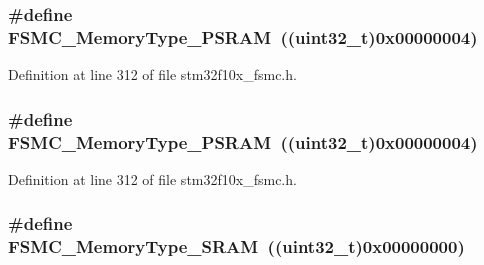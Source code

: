 \subsubsection[{\texorpdfstring{F\+S\+M\+C\+\_\+\+Memory\+Type\+\_\+\+P\+S\+R\+AM}{FSMC_MemoryType_PSRAM}}]{\setlength{\rightskip}{0pt plus 5cm}\#define F\+S\+M\+C\+\_\+\+Memory\+Type\+\_\+\+P\+S\+R\+AM~(({\bf uint32\+\_\+t})0x00000004)}\hypertarget{group___f_s_m_c___memory___type_gae3e680998b2fee8d56222634f5268a75}{}\label{group___f_s_m_c___memory___type_gae3e680998b2fee8d56222634f5268a75}


Definition at line 312 of file stm32f10x\+\_\+fsmc.\+h.

\subsubsection[{\texorpdfstring{F\+S\+M\+C\+\_\+\+Memory\+Type\+\_\+\+P\+S\+R\+AM}{FSMC_MemoryType_PSRAM}}]{\setlength{\rightskip}{0pt plus 5cm}\#define F\+S\+M\+C\+\_\+\+Memory\+Type\+\_\+\+P\+S\+R\+AM~(({\bf uint32\+\_\+t})0x00000004)}\hypertarget{group___f_s_m_c___memory___type_gae3e680998b2fee8d56222634f5268a75}{}\label{group___f_s_m_c___memory___type_gae3e680998b2fee8d56222634f5268a75}


Definition at line 312 of file stm32f10x\+\_\+fsmc.\+h.

\subsubsection[{\texorpdfstring{F\+S\+M\+C\+\_\+\+Memory\+Type\+\_\+\+S\+R\+AM}{FSMC_MemoryType_SRAM}}]{\setlength{\rightskip}{0pt plus 5cm}\#define F\+S\+M\+C\+\_\+\+Memory\+Type\+\_\+\+S\+R\+AM~(({\bf uint32\+\_\+t})0x00000000)}\hypertarget{group___f_s_m_c___memory___type_ga8a24e8da42e67dcf6fb2f43659aa49cf}{}\label{group___f_s_m_c___memory___type_ga8a24e8da42e67dcf6fb2f43659aa49cf}



